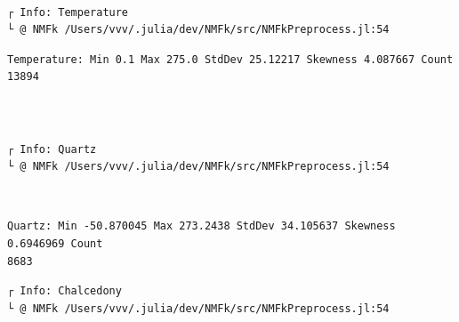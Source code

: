 \documentclass[11pt]{article}
\begin{document}
    \begin{center}
    \end{center}
    { \hspace*{\fill} \\}
    
    \begin{Verbatim}[commandchars=\\\{\}]
┌ Info: Temperature
└ @ NMFk /Users/vvv/.julia/dev/NMFk/src/NMFkPreprocess.jl:54
    \end{Verbatim}

    \begin{Verbatim}[commandchars=\\\{\}]
Temperature: Min 0.1 Max 275.0 StdDev 25.12217 Skewness 4.087667 Count 13894
    \end{Verbatim}

    \begin{center}
    \end{center}
    { \hspace*{\fill} \\}
    
    \begin{Verbatim}[commandchars=\\\{\}]

    \end{Verbatim}

    \begin{Verbatim}[commandchars=\\\{\}]
┌ Info: Quartz
└ @ NMFk /Users/vvv/.julia/dev/NMFk/src/NMFkPreprocess.jl:54
    \end{Verbatim}

    \begin{center}
    \end{center}
    { \hspace*{\fill} \\}
    
    \begin{Verbatim}[commandchars=\\\{\}]
Quartz: Min -50.870045 Max 273.2438 StdDev 34.105637 Skewness 0.6946969 Count
8683
    \end{Verbatim}

    \begin{Verbatim}[commandchars=\\\{\}]
┌ Info: Chalcedony
└ @ NMFk /Users/vvv/.julia/dev/NMFk/src/NMFkPreprocess.jl:54
    \end{Verbatim}
\end{document}
